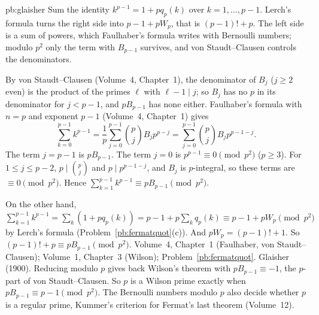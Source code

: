 \begin{solution}{pb:glaisher}
\idea Sum the identity $k^{p-1}=1+pq_p(k)$ over $k=1,\dots,p-1$. Lerch's formula turns the right side into $p-1+pW_p$, that is
$(p-1)!+p$. The left side is a sum of powers, which Faulhaber's formula writes with Bernoulli numbers; modulo $p^2$ only the
term with $B_{p-1}$ survives, and von Staudt--Clausen controls the denominators.

\writeup By von Staudt--Clausen (Volume~4, Chapter~1), the denominator of $B_j$ ($j\ge2$ even) is the product of the primes $\ell$ with
$\ell-1\mid j$; so $B_j$ has no $p$ in its denominator for $j<p-1$, and $pB_{p-1}$ has none either. Faulhaber's formula with $n=p$
and exponent $p-1$ (Volume~4, Chapter~1) gives
\[
\sum_{k=0}^{p-1}k^{p-1}=\frac1p\sum_{j=0}^{p-1}\binom pjB_jp^{p-j}=\sum_{j=0}^{p-1}\binom pjB_jp^{p-1-j}.
\]
The term $j=p-1$ is $pB_{p-1}$. The term $j=0$ is $p^{p-1}\equiv0\pmod{p^2}$ ($p\ge3$). For $1\le j\le p-2$, $p\mid\binom pj$ and
$p\mid p^{p-1-j}$, and $B_j$ is $p$-integral, so these terms are $\equiv0\pmod{p^2}$. Hence $\sum_{k=1}^{p-1}k^{p-1}\equiv pB_{p-1}\pmod{p^2}$.

On the other hand, $\sum_{k=1}^{p-1}k^{p-1}=\sum_k(1+pq_p(k))=p-1+p\sum_kq_p(k)\equiv p-1+pW_p\pmod{p^2}$ by Lerch's formula
(Problem~\ref{pb:fermatquot}(c)). And $pW_p=(p-1)!+1$. So $(p-1)!+p\equiv pB_{p-1}\pmod{p^2}$.
\tools Volume~4, Chapter~1 (Faulhaber, von Staudt--Clausen); Volume~1, Chapter~3 (Wilson); Problem~\ref{pb:fermatquot}.
\leads Glaisher (1900). Reducing modulo $p$ gives back Wilson's theorem with $pB_{p-1}\equiv-1$, the $p$-part of von Staudt--Clausen. So
$p$ is a Wilson prime exactly when $pB_{p-1}\equiv p-1\pmod{p^2}$. The Bernoulli numbers modulo $p$ also decide whether $p$ is a
regular prime, Kummer's criterion for Fermat's last theorem (Volume~12).
\end{solution}


